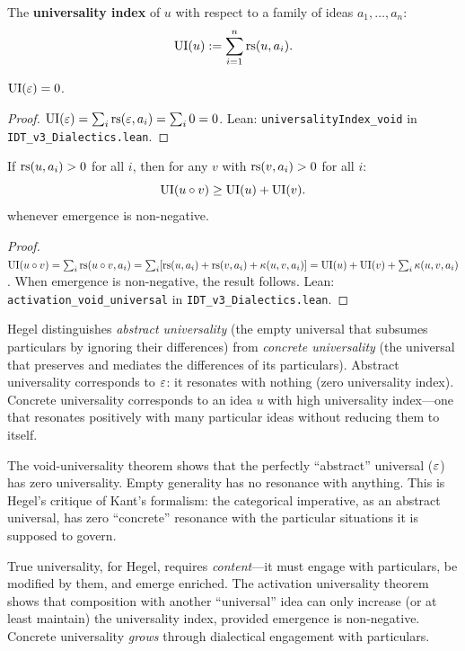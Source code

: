 \begin{definition}
\label{def:universality-index}
The \textbf{universality index} of $u$ with respect to a family of ideas
$a_1, \ldots, a_n$:
\[
\mathrm{UI}(u) := \sum_{i=1}^{n} \mathrm{rs}(u, a_i).
\]
\end{definition}

\begin{theorem}
\label{thm:void-universality}
$\mathrm{UI}(\varepsilon) = 0$.
\end{theorem}

\begin{proof}
$\mathrm{UI}(\varepsilon) = \sum_i \mathrm{rs}(\varepsilon, a_i) = \sum_i 0 = 0$.
Lean: \texttt{universalityIndex\_void} in \texttt{IDT\_v3\_Dialectics.lean}.
\end{proof}

\begin{theorem}
\label{thm:activation-universality}
If $\mathrm{rs}(u, a_i) > 0$ for all $i$, then for any $v$ with $\mathrm{rs}(v, a_i) > 0$
for all $i$:
\[
\mathrm{UI}(u \circ v) \geq \mathrm{UI}(u) + \mathrm{UI}(v).
\]
whenever emergence is non-negative.
\end{theorem}

\begin{proof}
$\mathrm{UI}(u \circ v) = \sum_i \mathrm{rs}(u \circ v, a_i) = \sum_i
[\mathrm{rs}(u, a_i) + \mathrm{rs}(v, a_i) + \kappa(u, v, a_i)]
= \mathrm{UI}(u) + \mathrm{UI}(v) + \sum_i \kappa(u, v, a_i)$.
When emergence is non-negative, the result follows.
Lean: \texttt{activation\_void\_universal} in \texttt{IDT\_v3\_Dialectics.lean}.
\end{proof}

\begin{interpretation}
Hegel distinguishes \emph{abstract universality} (the empty universal that
subsumes particulars by ignoring their differences) from \emph{concrete
universality} (the universal that preserves and mediates the differences of its
particulars). Abstract universality corresponds to $\varepsilon$: it resonates with
nothing (zero universality index). Concrete universality corresponds to an idea
$u$ with high universality index---one that resonates positively with many
particular ideas without reducing them to itself.

The void-universality theorem shows that the perfectly ``abstract'' universal
($\varepsilon$) has zero universality. Empty generality has no resonance with
anything. This is Hegel's critique of Kant's formalism: the categorical
imperative, as an abstract universal, has zero ``concrete'' resonance with the
particular situations it is supposed to govern.

True universality, for Hegel, requires \emph{content}---it must engage with
particulars, be modified by them, and emerge enriched. The activation
universality theorem shows that composition with another ``universal'' idea
can only increase (or at least maintain) the universality index, provided
emergence is non-negative. Concrete universality \emph{grows} through
dialectical engagement with particulars.
\end{interpretation}

